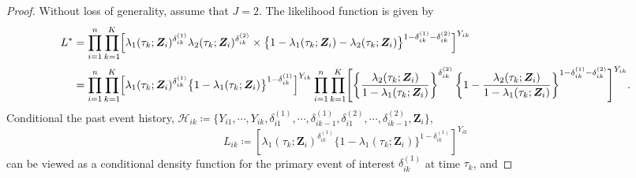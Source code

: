\documentclass{article}
\theoremstyle{plain}
\theoremstyle{definition}
\theoremstyle{remark}
\begin{document}
\begin{proof}
Without loss of generality, assume  that $J=2$. The likelihood function is given by
\begin{align*}
L^*
&=
\prod_{i=1}^n \prod_{k=1}^K
\Bigl[
\lambda_1(\tau_k;\bm Z_i)^{\delta_{ik}^{(1)}}
\lambda_2(\tau_k;\bm Z_i)^{\delta_{ik}^{(2)}}
\times
\bigl\{1-\lambda_1(\tau_k;\bm Z_i)-\lambda_2(\tau_k;\bm Z_i)\bigr\}^{1-\delta_{ik}^{(1)}-\delta_{ik}^{(2)}}
\Bigr]^{Y_{ik}}
\\[0.4ex]
&=
\prod_{i=1}^n \prod_{k=1}^K
\Bigl[
\lambda_1(\tau_k;\bm Z_i)^{\delta_{ik}^{(1)}}
\bigl\{1-\lambda_1(\tau_k;\bm Z_i)\bigr\}^{1-\delta_{ik}^{(1)}}
\Bigr]^{Y_{ik}}
\prod_{i=1}^n \prod_{k=1}^K
\Biggl[
\left\{\frac{\lambda_2(\tau_k;\bm Z_i)}{1-\lambda_1(\tau_k;\bm Z_i)}\right\}^{\delta_{ik}^{(2)}}
\left\{1-\frac{\lambda_2(\tau_k;\bm Z_i)}{1-\lambda_1(\tau_k;\bm Z_i)}\right\}^{1-\delta_{ik}^{(1)}-\delta_{ik}^{(2)}}
\Biggr]^{Y_{ik}}.
\end{align*}
Conditional the past event history, $\mathcal{H}_{ik} \coloneqq \{Y_{i1}, \cdots, Y_{ik},  \delta_{i1}^{(1)}, \cdots,  \delta_{ik-1}^{(1)}, \delta_{i1}^{(2)}, \cdots, \delta_{ik-1}^{(2)}, \bm Z_i\}$,
$$ L_{ik}\coloneqq\left[\lambda_1(\tau_k;\bm Z_i)^{\delta_{ik}^{(1)}} 
\{1-\lambda_1(\tau_k;\bm Z_i)\}^{1-\delta_{ik}^{(1)}}\right]^{Y_{ik}}$$
can be viewed as a conditional density function for the primary event of interest $\delta_{ik}^{(1)}$ at time $\tau_k$, and 

\end{proof}
\end{document}
